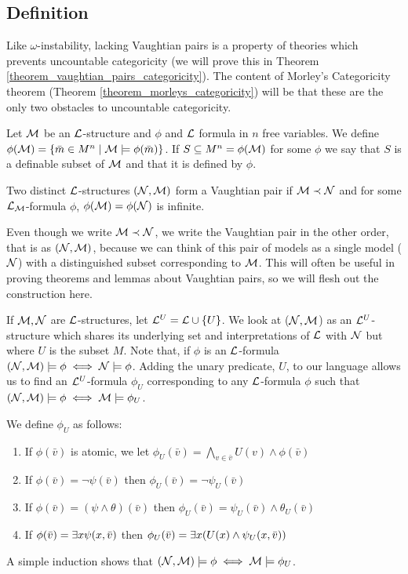 \subsection{Definition}
Like \(\omega\)-instability, lacking Vaughtian pairs is a property of theories which prevents uncountable categoricity (we will prove this in Theorem \ref{theorem_vaughtian_pairs_categoricity}).
The content of Morley's Categoricity theorem (Theorem \ref{theorem_morleys_categoricity}) will be that these are the only two obstacles to uncountable categoricity. 

\begin{definition}\label{definition_definable_subset}
Let \(\mathcal{M}\) be an \(\mathcal{L}\)-structure and \(\phi\) and \(\mathcal{L}\) formula in \(n\) free variables. 
We define \(\phi(\mathcal{M}) = \{\bar{m} \in M^n \mid \mathcal{M} \models \phi(\bar{m})\}\).
If \(S \subseteq M^n = \phi(\mathcal{M})\) for some \(\phi\) we say that \(S\) is a definable subset of \(\mathcal{M}\) and that it is defined by \(\phi\).
\end{definition}

\begin{definition}\label{definition_vaughtian_pairs}
Two distinct \(\mathcal{L}\)-structures \((\mathcal{N}, \mathcal{M})\) form a Vaughtian pair if \(\mathcal{M} \prec \mathcal{N}\) and for some \(\mathcal{L}_{\mathcal{M}}\)-formula \(\phi\), \(\phi(\mathcal{M}) = \phi(\mathcal{N})\) is infinite. 
\end{definition}

Even though we write \(\mathcal{M} \prec \mathcal{N}\), we write the Vaughtian pair in the other order, that is as \((\mathcal{N}, \mathcal{M})\), because we can think of this pair of models as a single model (\(\mathcal{N}\)) with a distinguished subset corresponding to \(\mathcal{M}\).
This will often be useful in proving theorems and lemmas about Vaughtian pairs, so we will flesh out the construction here. 

If \(\mathcal{M}, \mathcal{N}\) are \(\mathcal{L}\)-structures, let  \(\mathcal{L}^U = \mathcal{L} \cup \{U\}\). 
We look at (\(\mathcal{N}, \mathcal{M}\)) as an \(\mathcal{L}^U\)-structure which shares its underlying set and interpretations of \(\mathcal{L}\) with \(\mathcal{N}\) but where \(U\) is the subset \(M\). 
Note that, if \(\phi\) is an \(\mathcal{L}\)-formula \((\mathcal{N}, \mathcal{M}) \models \phi \iff \mathcal{N} \models \phi\).
Adding the unary predicate, \(U\), to our language allows us to find an \(\mathcal{L}^U\)-formula \(\phi_U\) corresponding to any \(\mathcal{L}\)-formula \(\phi\) such that \((\mathcal{N}, \mathcal{M}) \models \phi \iff \mathcal{M} \models \phi_U\).

We define \(\phi_U\) as follows:
\begin{enumerate}
\item If \(\phi(\bar{v})\) is atomic, we let \(\phi_U(\bar{v}) = \bigwedge_{v \in \bar{v}}U(v) \land \phi(\bar{v})\)
\item If \(\phi(\bar{v}) = \neg \psi(\bar{v})\) then \(\phi_U(\bar{v}) = \neg \psi_U(\bar{v})\)
\item If \(\phi(\bar{v}) = (\psi \land \theta)(\bar{v})\) then \(\phi_U(\bar{v}) = \psi_U(\bar{v}) \land \theta_U(\bar{v})\)
\item If \(\phi(\bar{v}) = \exists x \psi(x, \bar{v})\) then \(\phi_U(\bar{v}) = \exists x (U(x) \land \psi_U(x, \bar{v}))\)
\end{enumerate}
A simple induction shows that \((\mathcal{N}, \mathcal{M}) \models \phi \iff \mathcal{M} \models \phi_U\).

